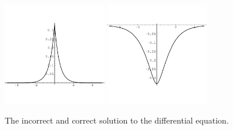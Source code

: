 \begin{figure}[tb!]
  \begin{center}
    \includegraphics[width=0.4\textwidth]{ode/inhomogeneous/wrongsol}
    \includegraphics[width=0.4\textwidth]{ode/inhomogeneous/rightsol}
  \end{center}
  \caption{The incorrect and correct solution to the differential equation.}
  \label{wrong_right_sol}
\end{figure}







